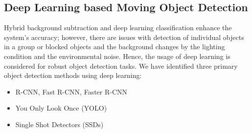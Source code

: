 \subsection{Deep Learning based Moving Object Detection}
\label{subsec:frameworks}
Hybrid background subtraction and deep learning classification enhance the system’s accuracy; however, there are issues with detection of individual objects in a group or blocked objects and the background changes by the lighting condition and the environmental noise. Hence, the usage of deep learning is considered for robust object detection tasks. We have identified three primary object detection methods using deep learning:
\begin{itemize}
\item R-CNN, Fast R-CNN, Faster R-CNN
\item You Only Look Once (YOLO)
\item Single Shot Detectors (SSDs) 
\end{itemize}
